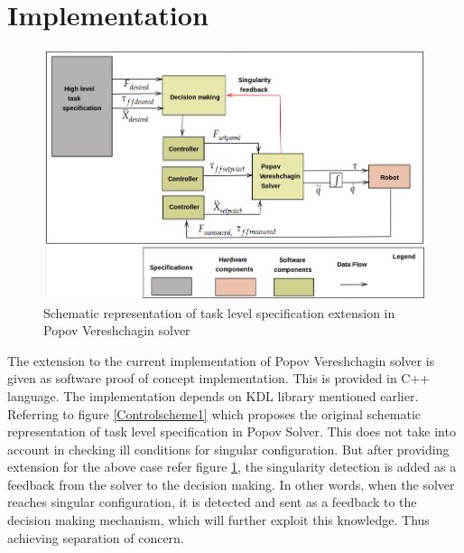 \section{Implementation}
	\begin{figure}[h!]
		\includegraphics[width=1.0\textwidth]{images/extensionscheme1}
		\caption{Schematic representation of task level specification extension in Popov Vereshchagin solver}
		\label{Controlscheme2}
	\end{figure}
The extension to the current implementation of Popov Vereshchagin solver is given as software proof of concept implementation. This is provided in C++ language. The implementation depends on KDL library \cite{kdl} mentioned earlier. Referring to figure \ref{Controlscheme1} which proposes the original schematic representation of task level specification in Popov Solver. This does not take into account in checking ill conditions for singular configuration. But after providing extension for the above case refer figure \ref{Controlscheme2}, the singularity detection is added as a feedback from the solver to the decision making. In other words, when the solver reaches singular configuration, it is detected and sent as a feedback to the decision making mechanism, which will further exploit this knowledge. Thus achieving separation of concern.

